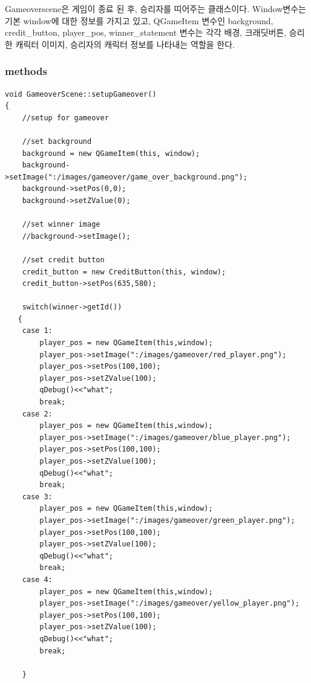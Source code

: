 \documentclass[10pt,oneside,a4paper,titlepage]{article}
\begin{document}
Gameoverscene은 게임이 종료 된 후, 승리자를 띠어주는 클래스이다. Window변수는 기본 window에 대한 정보를 가지고 있고, QGameItem 변수인 background, credit\_button, player\_pos, winner\_statement 변수는 각각 배경, 크래딧버튼, 승리한 캐릭터 이미지, 승리자의 캐릭터 정보를 나타내는 역할을 한다.

\subsubsection{methods}
\begin{lstlisting}
void GameoverScene::setupGameover()
{
    //setup for gameover

    //set background
    background = new QGameItem(this, window);
    background->setImage(":/images/gameover/game_over_background.png");
    background->setPos(0,0);
    background->setZValue(0);

    //set winner image
    //background->setImage();

    //set credit button
    credit_button = new CreditButton(this, window);
    credit_button->setPos(635,580);

    switch(winner->getId())
   {
    case 1:
        player_pos = new QGameItem(this,window);
        player_pos->setImage(":/images/gameover/red_player.png");
        player_pos->setPos(100,100);
        player_pos->setZValue(100);
        qDebug()<<"what";
        break;
    case 2:
        player_pos = new QGameItem(this,window);
        player_pos->setImage(":/images/gameover/blue_player.png");
        player_pos->setPos(100,100);
        player_pos->setZValue(100);
        qDebug()<<"what";
        break;
    case 3:
        player_pos = new QGameItem(this,window);
        player_pos->setImage(":/images/gameover/green_player.png");
        player_pos->setPos(100,100);
        player_pos->setZValue(100);
        qDebug()<<"what";
        break;
    case 4:
        player_pos = new QGameItem(this,window);
        player_pos->setImage(":/images/gameover/yellow_player.png");
        player_pos->setPos(100,100);
        player_pos->setZValue(100);
        qDebug()<<"what";
        break;

    }




\end{lstlisting}
\end{document}
